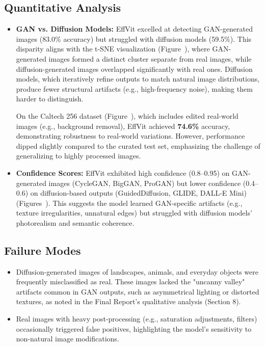\documentclass{article} %
\begin{document}
\subsection{Quantitative Analysis}
\begin{itemize}
    \item \textbf{GAN vs. Diffusion Models:}
          EffVit excelled at detecting GAN-generated images (83.0\% accuracy) but struggled with diffusion models (59.5\%). This disparity aligns with the t-SNE visualization (Figure~), where GAN-generated images formed a distinct cluster separate from real images, while diffusion-generated images overlapped significantly with real ones. Diffusion models, which iteratively refine outputs to match natural image distributions, produce fewer structural artifacts (e.g., high-frequency noise), making them harder to distinguish.

          On the Caltech 256 dataset (Figure~), which includes edited real-world images (e.g., background removal), EffVit achieved \textbf{74.6\%} accuracy, demonstrating robustness to real-world variations. However, performance dipped slightly compared to the curated test set, emphasizing the challenge of generalizing to highly processed images.

    \item \textbf{Confidence Scores:}
          EffVit exhibited high confidence (0.8--0.95) on GAN-generated images (CycleGAN, BigGAN, ProGAN) but lower confidence (0.4--0.6) on diffusion-based outputs (GuidedDiffusion, GLIDE, DALL-E Mini) (Figures~). This suggests the model learned GAN-specific artifacts (e.g., texture irregularities, unnatural edges) but struggled with diffusion models' photorealism and semantic coherence.
\end{itemize}

\subsection{Failure Modes}
\begin{itemize}
    \item Diffusion-generated images of landscapes, animals, and everyday objects were frequently misclassified as real. These images lacked the "uncanny valley" artifacts common in GAN outputs, such as asymmetrical lighting or distorted textures, as noted in the Final Report's qualitative analysis (Section 8).
    \item Real images with heavy post-processing (e.g., saturation adjustments, filters) occasionally triggered false positives, highlighting the model's sensitivity to non-natural image modifications.
\end{itemize}
\end{document}
